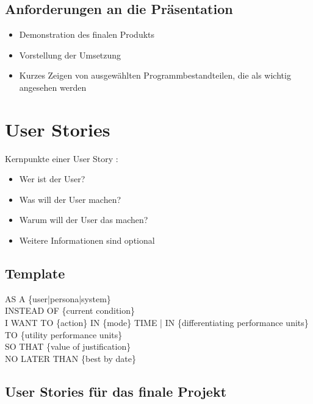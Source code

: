 \documentclass[../main.tex]{subfiles}
\begin{document}
\subsection{Anforderungen an die Präsentation}
\begin{itemize}
    \item Demonstration des finalen Produkts
    \item Vorstellung der Umsetzung
    \item Kurzes Zeigen von ausgewählten Programmbestandteilen, die als wichtig angesehen werden
\end{itemize}

\section{User Stories}
Kernpunkte einer User Story \cite{anatomyOfAUserStory}:
\begin{itemize}
    \item Wer ist der User?
    \item Was will der User machen?
    \item Warum will der User das machen?
    \item Weitere Informationen sind optional
\end{itemize}

\subsection{Template \cite{anatomyOfAUserStory}}
AS A \{user|persona|system\} \\
INSTEAD OF \{current condition\} \\
I WANT TO \{action\} IN \{mode\} TIME | IN \{differentiating performance units\} TO \{utility performance units\} \\
SO THAT \{value of justification\} \\
NO LATER THAN \{best by date\}

\subsection{User Stories für das finale Projekt}
\end{document}
